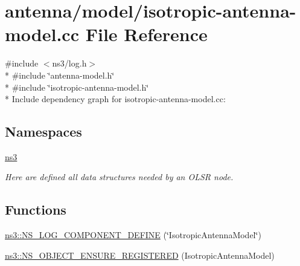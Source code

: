 \hypertarget{isotropic-antenna-model_8cc}{}\section{antenna/model/isotropic-\/antenna-\/model.cc File Reference}
\label{isotropic-antenna-model_8cc}
{\ttfamily \#include $<$ns3/log.\+h$>$}\\*
{\ttfamily \#include \char`\"{}antenna-\/model.\+h\char`\"{}}\\*
{\ttfamily \#include \char`\"{}isotropic-\/antenna-\/model.\+h\char`\"{}}\\*
Include dependency graph for isotropic-\/antenna-\/model.cc\+:
\subsection*{Namespaces}
\begin{DoxyCompactItemize}
\item 
 \hyperlink{namespacens3}{ns3}
\begin{DoxyCompactList}\small\item\em Here are defined all data structures needed by an O\+L\+SR node. \end{DoxyCompactList}\end{DoxyCompactItemize}
\subsection*{Functions}
\begin{DoxyCompactItemize}
\item 
\hyperlink{namespacens3_a2851fe6806dd8f954da7a961b4957cb1}{ns3\+::\+N\+S\+\_\+\+L\+O\+G\+\_\+\+C\+O\+M\+P\+O\+N\+E\+N\+T\+\_\+\+D\+E\+F\+I\+NE} (\char`\"{}Isotropic\+Antenna\+Model\char`\"{})
\item 
\hyperlink{namespacens3_a8e4e170b3896aad2d885ad4944ad3c1e}{ns3\+::\+N\+S\+\_\+\+O\+B\+J\+E\+C\+T\+\_\+\+E\+N\+S\+U\+R\+E\+\_\+\+R\+E\+G\+I\+S\+T\+E\+R\+ED} (Isotropic\+Antenna\+Model)
\end{DoxyCompactItemize}
